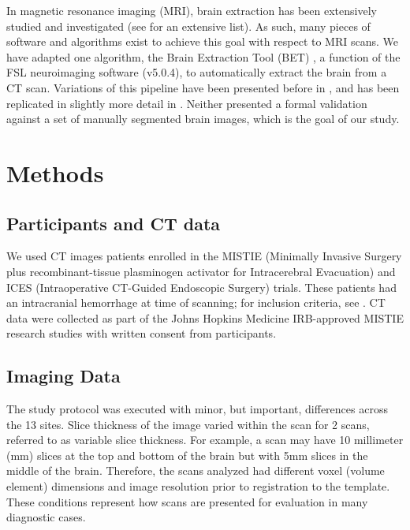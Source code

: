 \documentclass{elsarticle}\usepackage[]{graphicx}\usepackage[]{color}
\begin{document}
In magnetic resonance imaging (MRI), brain extraction has been extensively studied and investigated (see \citet{wang2014knowledge} for an extensive list).  As such, many pieces of software and algorithms exist to achieve this goal with respect to MRI scans.  We have adapted one algorithm, the Brain Extraction Tool (BET) \citep{smith_fast_2002}, a function of the FSL \citep{jenkinson_fsl_2012} neuroimaging software (v5.0.4), to automatically extract the brain from a CT scan.  Variations of this pipeline have been presented before in \citet{able}, and has been replicated in slightly more detail in \citet{rorden_age-specific_2012}.  Neither presented a formal validation against a set of manually segmented brain images, which is the goal of our study. 


\section{Methods}
\subsection{ Participants and CT data}
We used CT images patients enrolled in the MISTIE (Minimally Invasive Surgery plus recombinant-tissue plasminogen activator for Intracerebral Evacuation) and ICES (Intraoperative CT-Guided Endoscopic Surgery) trials.  These patients had an intracranial hemorrhage at time of scanning; for inclusion criteria, see \citet{mould_minimally_2013}. CT data were collected as part of the Johns Hopkins Medicine IRB-approved MISTIE research studies with written consent from participants.  


\subsection{Imaging Data}
The study protocol was executed with minor, but important, differences across the 13 sites.  
Slice thickness of the image varied within the scan for 2 scans, referred to as variable slice thickness. For example, a scan may have 10 millimeter (mm) slices at the top and bottom of the brain but with 5mm slices in the middle of the brain.  Therefore, the scans analyzed had different voxel (volume element) dimensions and image resolution prior to registration to the template.  These conditions represent how scans are presented for evaluation in many diagnostic cases.
\end{document}
